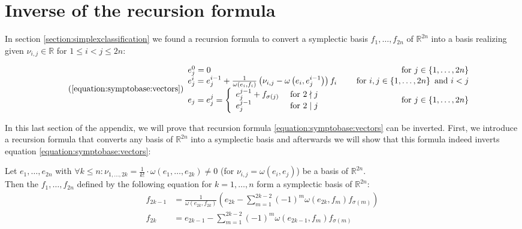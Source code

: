 \documentclass[../SymplecticSimplices.tex]{subfiles}
\begin{document}
\section{Inverse of the recursion formula}
\label{appendix:revertingtheformula}
In section \ref{section:simplexclassification} we found a recursion formula to convert a symplectic basis \( f_1, \dots, f_{2n} \) of \( \mathbb{R}^{2n} \) into a basis realizing given \( \nu_{i,j} \in \mathbb{R} \) for \( 1 \leq i < j \leq 2n \):

\begin{equation}
  \tag{\ref{equation:symptobase:vectors}}
  \begin{array}{llr}
    e_j^0 = 0 & & \textnormal{ for } j \in \left\lbrace 1, \dots, 2n \right\rbrace \\
    e_j^i = e_j^{i-1} + \frac{1}{\omega\left( e_i, f_i \right)} \left( \nu_{i,j} - \omega \left( e_i, e_j^{i-1} \right) \right) f_i & & \textnormal{ for } i,j \in \left\lbrace 1, \dots, 2n \right\rbrace \textnormal{ and } i < j\\
    e_j = e_j^j = \left\lbrace\begin{array}{lr}
        e_j^{j-1} + f_{\sigma\left(j\right)} & \textnormal{ for } 2 \nmid j \\
        e_j^{j-1} & \textnormal{ for } 2 \mid j
    \end{array}\right. & & \textnormal{ for } j \in \left\lbrace 1, \dots, 2n \right\rbrace
  \end{array}
\end{equation}

In this last section of the appendix, we will prove that recursion formula \eqref{equation:symptobase:vectors} can be inverted. First, we introduce a recursion formula that converts any basis of \( \mathbb{R}^{2n} \) into a symplectic basis and afterwards we will show that this formula indeed inverts equation \eqref{equation:symptobase:vectors}:

\begin{lemma}
  \label{lemma:simplexedgestosymplecticbase}
  Let \( e_1, \dots, e_{2n} \) with \( \forall k \leq n : \nu_{1,\dots,2k } = \frac{1}{k!} \cdot \omega \left( e_1, \dots, e_{2k} \right) \neq 0 \) (for \( \nu_{i,j} = \omega \left( e_i, e_j \right) \)) be a basis of \( \mathbb{R}^{2n} \).\\
  Then the \( f_1, \dots, f_{2n} \) defined by the following equation for \( k = 1, \dots, n \) form a symplectic basis of \( \mathbb{R}^{2n} \):
  \begin{equation}
    \label{equation:basistosymp}
    \begin{split}
      f_{2k-1} & = \frac{1}{\omega \left( e_{2k}, f_{2k} \right)} \left( e_{2k} - \sum \limits _{m=1}^{2k-2} \left( -1 \right)^{m} \omega \left( e_{2k}, f_m \right) f_{\sigma \left( m \right)} \right) \\
      f_{2k} & = e_{2k-1} - \sum \limits _{m=1}^{2k-2} \left( -1 \right)^{m} \omega \left( e_{2k-1}, f_m \right) f_{\sigma \left( m \right)}
    \end{split}
  \end{equation}
\end{lemma}
\end{document}
